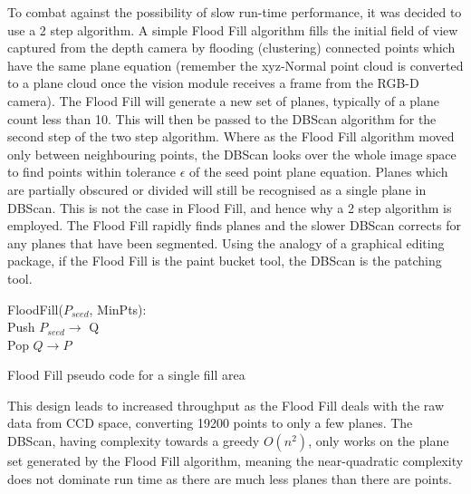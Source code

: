 \documentclass[]{article}
\begin{document}
{To combat against the possibility of slow run-time performance, it was decided to use a 2 step algorithm. A simple Flood Fill algorithm fills the initial field of view captured from the depth camera by flooding (clustering) connected points which have the same plane equation (remember the xyz-Normal point cloud is converted to a plane cloud once the vision module receives a frame from the RGB-D camera). The Flood Fill will generate a new set of planes, typically of a plane count less than 10. This will then be passed to the DBScan algorithm for the second step of the two step algorithm. Where as the Flood Fill algorithm moved only between neighbouring points, the DBScan looks over the whole image space to find points within tolerance $\epsilon$ of the seed point plane equation. Planes which are partially obscured or divided  will still be recognised as a single plane in DBScan. This is not the case in Flood Fill, and hence why a 2 step algorithm is employed. The Flood Fill rapidly finds planes and the slower DBScan corrects for any planes that have been segmented. Using the analogy of a graphical editing package, if the Flood Fill is the paint bucket tool, the DBScan is the patching tool.

\begin{algorithm}[tbp]
	\SetAlgoLined
	\bigskip
	FloodFill($P_{seed}$, MinPts): \\
	Push $P_{seed} \rightarrow$ Q \\
	{
	 	Pop $Q \rightarrow P$ \\
	}
	\bigskip
	\caption{Flood Fill pseudo code for a single fill area}
	\label{alg:flood_fill}
\end{algorithm}

This design leads to increased throughput as the Flood Fill deals with the raw data from CCD space, converting 19200 points to only a few planes. The DBScan, having complexity towards a greedy $O(n^{2})$, only works on the plane set generated by the Flood Fill algorithm, meaning the near-quadratic complexity does not dominate run time as there are much less planes than there are points.

}
\end{document}
